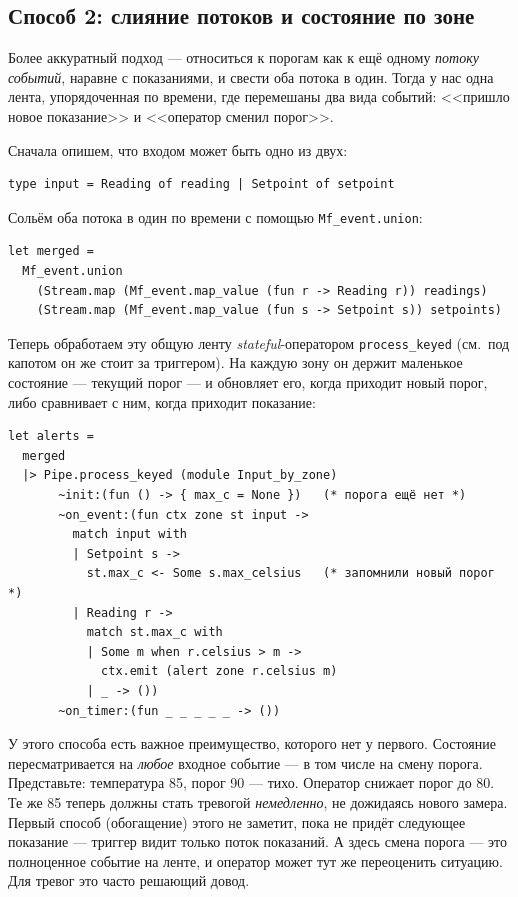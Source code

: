 \documentclass[11pt,a4paper]{article}
\begin{document}
\subsection{Способ 2: слияние потоков и состояние по зоне}

Более аккуратный подход --- относиться к порогам как к ещё одному
\emph{потоку событий}, наравне с показаниями, и свести оба потока в
один. Тогда у нас одна лента, упорядоченная по времени, где
перемешаны два вида событий: <<пришло новое показание>> и <<оператор
сменил порог>>.

Сначала опишем, что входом может быть одно из двух:

\begin{lstlisting}
type input = Reading of reading | Setpoint of setpoint
\end{lstlisting}

Сольём оба потока в один по времени с помощью \texttt{Mf\_event.union}:

\begin{lstlisting}
let merged =
  Mf_event.union
    (Stream.map (Mf_event.map_value (fun r -> Reading r)) readings)
    (Stream.map (Mf_event.map_value (fun s -> Setpoint s)) setpoints)
\end{lstlisting}

Теперь обработаем эту общую ленту \emph{stateful}-оператором
\texttt{process\_keyed} (см.\ под капотом он же стоит за триггером). На
каждую зону он держит маленькое состояние --- текущий порог --- и
обновляет его, когда приходит новый порог, либо сравнивает с ним, когда
приходит показание:

\begin{lstlisting}
let alerts =
  merged
  |> Pipe.process_keyed (module Input_by_zone)
       ~init:(fun () -> { max_c = None })   (* порога ещё нет *)
       ~on_event:(fun ctx zone st input ->
         match input with
         | Setpoint s ->
           st.max_c <- Some s.max_celsius   (* запомнили новый порог *)
         | Reading r ->
           match st.max_c with
           | Some m when r.celsius > m ->
             ctx.emit (alert zone r.celsius m)
           | _ -> ())
       ~on_timer:(fun _ _ _ _ _ -> ())
\end{lstlisting}

У этого способа есть важное преимущество, которого нет у первого.
Состояние пересматривается на \emph{любое} входное событие --- в том
числе на смену порога. Представьте: температура 85, порог 90 ---
тихо. Оператор снижает порог до 80. Те же 85 теперь должны стать
тревогой \emph{немедленно}, не дожидаясь нового замера. Первый способ
(обогащение) этого не заметит, пока не придёт следующее показание ---
триггер видит только поток показаний. А здесь смена порога --- это
полноценное событие на ленте, и оператор может тут же переоценить
ситуацию. Для тревог это часто решающий довод.
\end{document}
